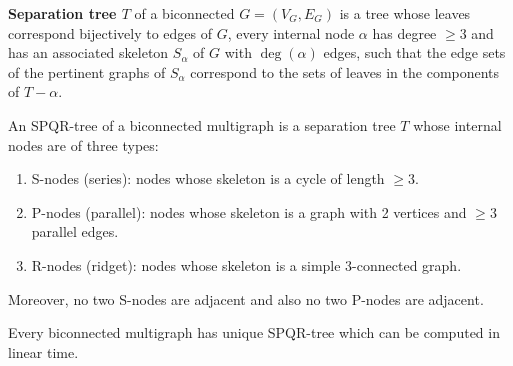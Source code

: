 \begin{defn}
	\textbf{Separation tree $T$} of a biconnected $G = (V_G, E_G)$ is a tree whose leaves correspond bijectively to edges of $G$, every internal node $\alpha$ has degree $\geq 3$ and has an associated skeleton $S_\alpha$ of $G$ with $\deg(\alpha)$ edges, such that the edge sets of the pertinent graphs of $S_\alpha$ correspond to the sets of leaves in the components of $T - \alpha$.
\end{defn}

\begin{defn}
	An SPQR-tree of a biconnected multigraph is a separation tree $T$ whose internal nodes are of three types:
	
	\begin{enumerate}
		\item S-nodes (series): nodes whose skeleton is a cycle of length $\geq 3$.
		\item P-nodes (parallel): nodes whose skeleton is a graph with 2 vertices and $\geq 3$ parallel edges.
		\item R-nodes (ridget): nodes whose skeleton is a simple 3-connected graph.
	\end{enumerate}
	
	\noindent Moreover, no two S-nodes are adjacent and also no two P-nodes are adjacent.
\end{defn}

\begin{fact}
	Every biconnected multigraph has unique SPQR-tree which can be computed in linear time.
\end{fact}